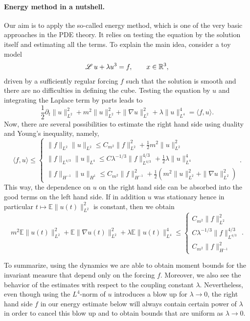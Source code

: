 \documentclass[a4paper,11pt]{article}
\numberwithin{equation}{section}
\newcommand{\LL}{\mathscr{L} \hspace{.2em}}
\begin{document}
\paragraph{Energy method in a nutshell.}Our aim is to apply the so-called
energy method, which is one of the very basic approaches in the PDE theory. It
relies on testing the equation by the solution itself and estimating all the
terms. To explain the main idea, consider a toy model
\[ \LL u + \lambda u^3 = f, \qquad x \in \mathbb{R}^3,
\]
driven by a sufficiently regular forcing $f$ such that  the solution is
smooth and there are no difficulties in defining the cube. Testing the
equation by $u$ and integrating the Laplace term by parts leads to
\[ \frac{1}{2} \partial_t \| u \|_{L^2}^2 + m^2 \| u \|_{L^2}^2 + \| \nabla u
   \|_{L^2}^2 + \lambda \| u \|_{L^4}^4 = \langle f, u \rangle . \]
Now, there are several possibilities to estimate the right hand side using
duality and Young's inequality, namely,
\[ \langle f, u \rangle \leqslant \left\{ \begin{array}{l}
     \| f \|_{L^2} \| u \|_{L^2} \leqslant C_{ m^2} \| f \|_{L^2}^2 +
     \frac12 m^2 \| u \|_{L^2}^2\\
     \| f \|_{L^{4 / 3}} \| u \|_{L^4} \leqslant C \lambda^{- 1 / 3}
     \| f \|_{L^{4 / 3}}^{4 / 3} + \frac12 \lambda \| u \|_{L^4}^4\\
     \| f \|_{H^{- 1}} \| u \|_{H^1} \leqslant C_{m^2} \| f \|_{H^{-
     1}}^2 + \frac12 (m^2 \| u \|_{L^2}^2 + \| \nabla u \|_{L^2}^2)
   \end{array} . \right. \]
This way, the dependence on $u$ on the right hand side can be absorbed into
the good terms on the left hand side. If in
addition $u$ was stationary hence in particular $t \mapsto \mathbb{E} \| u (t)
\|_{L^2}^2$ is constant, then we obtain
\[ m^2 \mathbb{E} \| u (t) \|_{L^2}^2 +\mathbb{E} \| \nabla u (t) \|_{L^2}^2 +
   \lambda \mathbb{E} \| u (t) \|_{L^4}^4 \leqslant \left\{ \begin{array}{l}
     C_{m^2} \| f \|_{L^2}^2\\
     C \lambda^{- 1 / 3} \| f \|_{L^{4 / 3}}^{4 / 3}\\
     C_{m^2} \| f \|_{H^{- 1}}^2
   \end{array} . \right. \]


To summarize, using the dynamics we are able to obtain moment bounds for the
invariant measure that depend only on the forcing $f$. Moreover, we also see
the behavior of the estimates with respect to the coupling constant $\lambda$.
Nevertheless, even though using the $L^4$-norm of $u$ introduces a blow up for
$\lambda \rightarrow 0$, the right hand side $f$ in our energy estimate below
will always contain certain power of $\lambda$ in order to cancel this blow up
and to obtain bounds that are uniform as $\lambda \rightarrow 0$.
\end{document}
